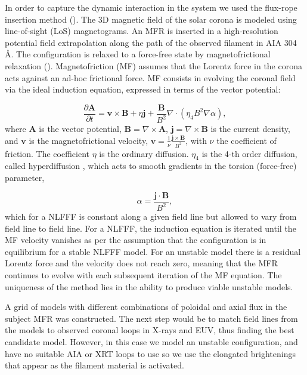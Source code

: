 \documentclass[preprint]{aastex}
\newcommand{\Bv}{\mathbf{v}}
\newcommand{\BB}{\mathbf{B}}
\newcommand{\Bj}{\mathbf{j}}
\newcommand{\BA}{\mathbf{A}}
\newcommand{\dAdt}{\frac{\partial\mathbf{A}}{\partial t}}
\begin{document}
In order to capture the dynamic interaction in the system we used the flux-rope insertion method (\citealt{vanBallegooijen_2004, Savcheva_vanBallego_2009, Su_etal_2009, Savcheva_etal_2012, Bobra_etal_2008}). The 3D magnetic field of the solar corona is modeled using line-of-sight (LoS) magnetograms. An MFR is inserted in a high-resolution potential field extrapolation along the path of the observed filament in AIA 304\,\AA. The configuration is relaxed to a force-free state by magnetofrictional relaxation (\citealt{Yang_etal_1986, vanBallegooijen00}). Magnetofriction (MF) assumes that the Lorentz force in the corona acts against an ad-hoc frictional force. 
MF consists in evolving the coronal field via the ideal induction equation, expressed in terms of the vector potential:

\begin{equation}
\dAdt = \Bv\times\BB+\eta\Bj+\frac{\BB}{B^2}\nabla\cdot(\eta_4B^2\nabla\alpha), 
\end{equation}
where $\mathbf{A}$ is the vector potential, $\BB=\nabla\times\BA$, $\Bj=\nabla\times\BB$ is the current density, and $\Bv$ is the magnetofrictional velocity, $\Bv=\frac{1}{\nu}\frac{\Bj\times\BB}{B^2}$, with $\nu$ the coefficient of friction. The coefficient $\eta$ is the ordinary diffusion. $\eta_4$ is the 4-th order diffusion, called hyperdiffusion \citep{vanBallegooijen00}, which acts to smooth gradients in the torsion (force-free) parameter, 

\begin{equation}
\alpha=\frac{\Bj\cdot\BB}{B^2}, 
\end{equation}
which for a NLFFF is constant along a given field line but allowed to vary from field line to field line. For a NLFFF, the induction equation is iterated until the MF velocity vanishes as per the assumption that the configuration is in equilibrium for a stable NLFFF model. For an unstable model there is a residual Lorentz force and the velocity does not reach zero, meaning that the MFR continues to evolve with each subsequent iteration of the MF equation. The uniqueness of the method lies in the ability to produce viable unstable models. 

A grid of models with different combinations of poloidal and axial flux in the subject MFR was constructed. The next step would be to match field lines from the models to observed coronal loops in X-rays and EUV, thus finding the best candidate model. However, in this case we model an unstable configuration, and have no suitable AIA or XRT loops to use so we use the elongated brightenings that appear as the filament material is activated.   
\end{document}
